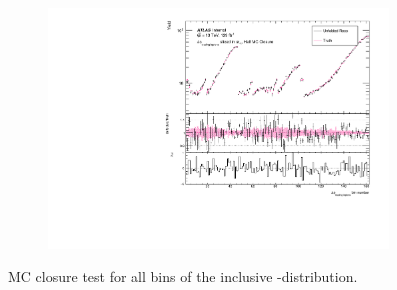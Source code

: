\begin{figure}[htb]
  \centering
  \begin{subfigure}{.65\textwidth}\centering\includegraphics[width = 0.99\textwidth]{Figures/m4l/UnfoldingStudies/v014_closure/HalfMCClosure_withPull_deltaPhiLeadingLeptons_m4l.pdf}\end{subfigure}
\caption{MC closure test for all bins of the inclusive \dPhill-\mFourL distribution.\label{fig:dphihalf}}
 \end{figure}

